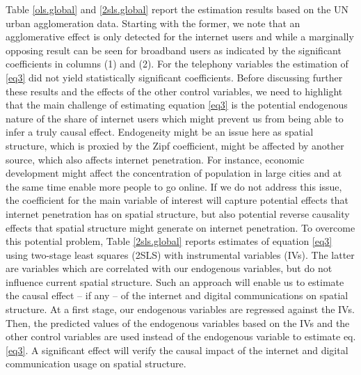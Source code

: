 \documentclass[10pt,letterpaper]{article}
\begin{document}
Table \ref{ols.global} and \ref{2sls.global} report the estimation
results based on the UN urban agglomeration data. Starting with the
former, we note that an agglomerative effect is only detected for the
internet users and while a marginally opposing result can be seen for
broadband users as indicated by the significant coefficients in columns
(1) and (2). For the telephony variables the estimation of \ref{eq3} did
not yield statistically significant coefficients. Before discussing
further these results and the effects of the other control variables, we
need to highlight that the main challenge of estimating equation
\ref{eq3} is the potential endogenous nature of the share of internet
users which might prevent us from being able to infer a truly causal
effect. Endogeneity might be an issue here as spatial structure, which
is proxied by the Zipf coefficient, might be affected by another source,
which also affects internet penetration. For instance, economic
development might affect the concentration of population in large cities
and at the same time enable more people to go online. If we do not
address this issue, the coefficient for the main variable of interest
will capture potential effects that internet penetration has on spatial
structure, but also potential reverse causality effects that spatial
structure might generate on internet penetration. To overcome this
potential problem, Table \ref{2sls.global} reports estimates of equation
\ref{eq3} using two-stage least squares (2SLS) with instrumental
variables (IVs). The latter are variables which are correlated with our
endogenous variables, but do not influence current spatial structure.
Such an approach will enable us to estimate the causal effect -- if any
-- of the internet and digital communications on spatial structure. At a
first stage, our endogenous variables are regressed against the IVs.
Then, the predicted values of the endogenous variables based on the IVs
and the other control variables are used instead of the endogenous
variable to estimate eq. \ref{eq3}. A significant effect will verify the
causal impact of the internet and digital communication usage on spatial
structure.
\end{document}
